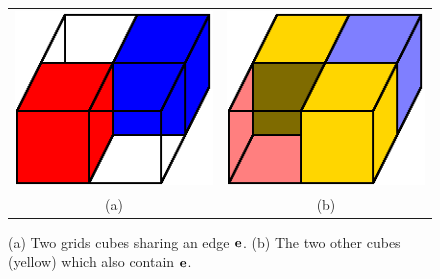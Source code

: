 \begin{figure}[t]
\centering

\begin{tabular}{cc}
\includegraphics[width=0.4\linewidth]{images/shared_edge.eps} \qquad &
\qquad
\includegraphics[width=0.4\linewidth]{images/shared_edge_B.eps} \\
(a) & (b)
\end{tabular}

\caption{(a) Two grids cubes sharing an edge $\mathbf{e}$.
(b) The two other cubes (yellow) which also contain $\mathbf{e}$.
}
\label{fig:shared_edge}
\end{figure}

